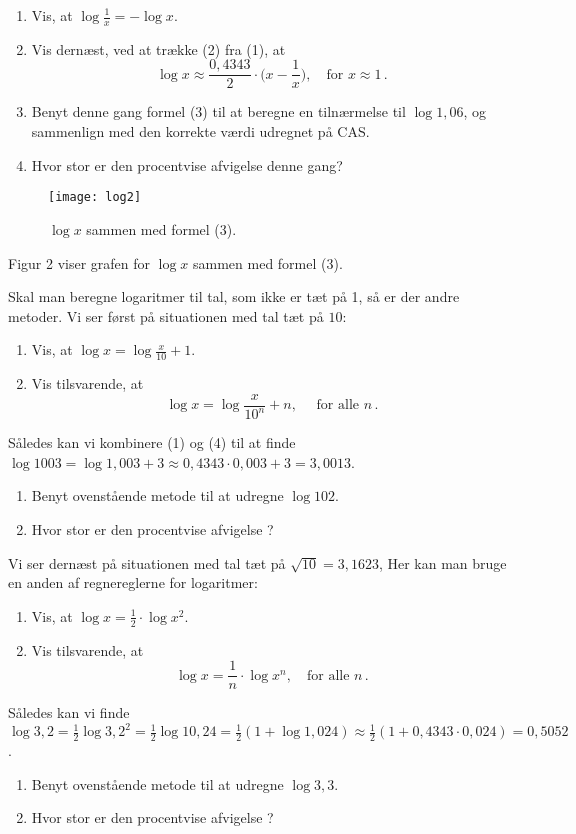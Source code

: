 \documentclass[12pt,oneside,a4paper]{article}
\theoremstyle{plain}
\begin{document}
\begin{enumerate}[label=(\alph*), resume]
    \item Vis, at $\log\frac1x = -\log x$.
    \item Vis dernæst, ved at trække (2) fra (1), at 
        \[
            \tag{3}
            \log x \approx \frac{0,4343}{2} \cdot \Big(x-\frac1x\Big),\quad
            \mbox{for $x\approx 1$}\,.
            \]
    \item Benyt denne gang formel (3) til at beregne en tilnærmelse til $\log
        1,06$, og sammenlign med den korrekte værdi udregnet på CAS.
    \item Hvor stor er den procentvise afvigelse denne gang?
\end{enumerate}
\begin{figure}[ht]
    \centering
    \texttt{[image: log2]}
    \caption{$\log x$ sammen med formel (3).}
    \label{log2}
\end{figure}
Figur 2 viser grafen for $\log x$ sammen med formel (3).

Skal man beregne logaritmer til tal, som ikke er tæt på 1, så er der andre metoder.
Vi ser først på situationen med tal tæt på $10$:

\begin{enumerate}[label=(\alph*), resume]
    \item Vis, at $\log x = \log\frac{x}{10} + 1$.
    \item Vis tilsvarende, at 
        \[
            \tag{4}
            \log x = \log\frac{x}{10^n} + n,\quad\mbox{ for alle $n$}\,.
        \]

\end{enumerate}
Således kan vi kombinere (1) og (4) til at finde $\log 1003 = \log 1,003 + 3
\approx 0,4343\cdot 0,003 + 3 = 3,0013$.
\begin{enumerate}[label=(\alph*), resume]
    \item Benyt ovenstående metode til at udregne $\log 102$.
    \item Hvor stor er den procentvise afvigelse ?
\end{enumerate}

Vi ser dernæst på situationen med tal tæt på $\sqrt{10} = 3,1623$, Her kan man
bruge en anden af regnereglerne for logaritmer:
\begin{enumerate}[label=(\alph*), resume]
    \item Vis, at $\log x = \frac12 \cdot \log x^2$.
    \item Vis tilsvarende, at
        \[
            \tag{5}
            \log x = \frac1n \cdot \log x^n,\quad \mbox{for alle $n$}\,.
        \]
\end{enumerate}
Således kan vi finde $\log 3,2 = \frac12 \log 3,2^2 = \frac12 \log 10,24
 = \frac12 (1 + \log 1,024) \approx \frac12 (1 + 0,4343\cdot 0,024)
 = 0,5052$.
\begin{enumerate}[label=(\alph*), resume]
    \item Benyt ovenstående metode til at udregne $\log 3,3$.
    \item Hvor stor er den procentvise afvigelse ?
\end{enumerate}
\end{document}
